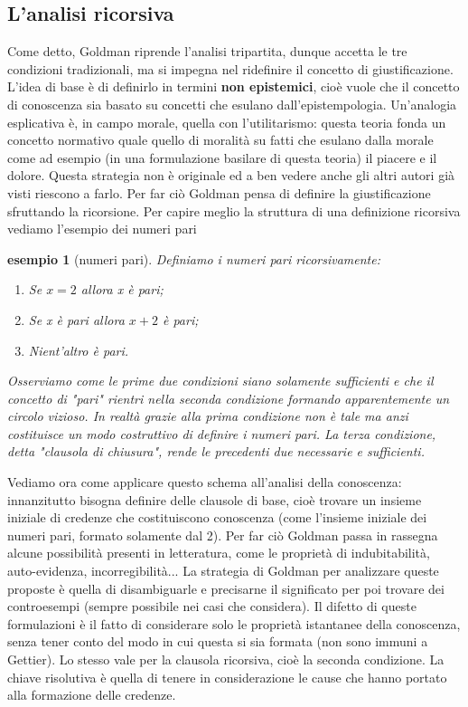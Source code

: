 \documentclass[10pt,a4paper]{article}
\newtheorem{esempio}{esempio}
\begin{document}
\subsection{L'analisi ricorsiva}
Come detto, Goldman riprende l'analisi tripartita, dunque accetta le tre condizioni tradizionali, ma si impegna nel ridefinire il concetto di giustificazione. L'idea di base è di definirlo in termini \textbf{non epistemici}, cioè vuole che il concetto di conoscenza sia basato su concetti che esulano dall'epistempologia. Un'analogia esplicativa è, in campo morale, quella con l'utilitarismo: questa teoria fonda un concetto normativo quale quello di moralità su fatti che esulano dalla morale come ad esempio (in una formulazione basilare di questa teoria) il piacere e il dolore. Questa strategia non è originale ed a ben vedere anche gli altri autori già visti riescono a farlo. Per far ciò Goldman pensa di definire la giustificazione sfruttando la ricorsione. Per capire meglio la struttura di una definizione ricorsiva vediamo l'esempio dei numeri pari
\begin{esempio}[numeri pari]
Definiamo i numeri pari ricorsivamente:
\begin{enumerate}
\item Se \(x=2\) allora x è pari;
\item Se x è pari allora \(x+2\) è pari;
\item Nient'altro è pari.
\end{enumerate}
Osserviamo come le prime due condizioni siano solamente sufficienti e che il concetto di "pari" rientri nella seconda condizione formando apparentemente un circolo vizioso. In realtà grazie alla prima condizione non è tale ma anzi costituisce un modo costruttivo di definire i numeri pari. La terza condizione, detta "clausola di chiusura", rende le precedenti due necessarie e sufficienti.
\end{esempio}
Vediamo ora come applicare questo schema all'analisi della conoscenza: innanzitutto bisogna definire delle clausole di base, cioè trovare un insieme iniziale di credenze che costituiscono conoscenza (come l'insieme iniziale dei numeri pari, formato solamente dal 2). Per far ciò Goldman passa in rassegna alcune possibilità presenti in letteratura, come le proprietà di indubitabilità, auto-evidenza, incorregibilità... La strategia di Goldman per analizzare queste proposte è quella di disambiguarle e precisarne il significato per poi trovare dei controesempi (sempre possibile nei casi che considera). Il difetto di queste formulazioni è il fatto di considerare solo le proprietà istantanee della conoscenza, senza tener conto del modo in cui questa si sia formata (non sono immuni a Gettier). Lo stesso vale per la clausola ricorsiva, cioè la seconda condizione. La chiave risolutiva è quella di tenere in considerazione le cause che hanno portato alla formazione delle credenze.\\
\end{document}
